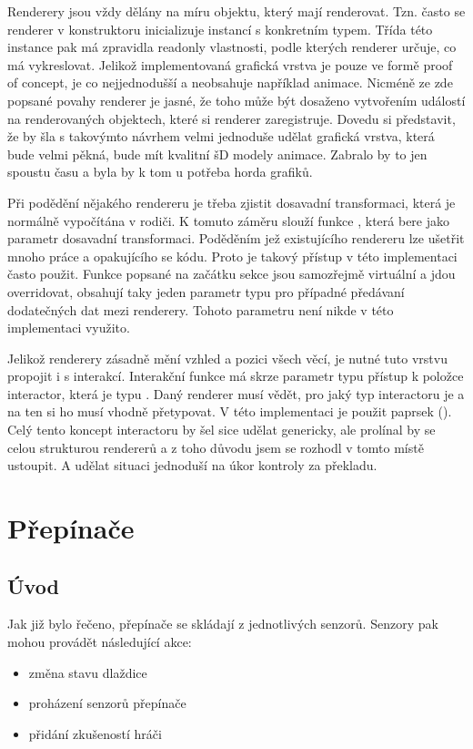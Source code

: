 Renderery jsou vždy dělány na míru objektu, který mají renderovat. Tzn. často se renderer v konstruktoru 
inicializuje instancí s konkretním typem. Třída této instance pak má zpravidla readonly vlastnosti,
podle kterých renderer určuje, co má vykreslovat. Jelikož implementovaná grafická vrstva je pouze ve formě proof of concept,
je co nejjednodušší a neobsahuje například animace. Nicméně ze zde popsané povahy renderer je jasné, že 
toho může být dosaženo vytvořením událostí na renderovaných objektech, které si renderer zaregistruje.
Dovedu si představit, že by šla s takovýmto návrhem velmi jednoduše udělat grafická vrstva, která bude
velmi pěkná, bude mít kvalitní šD modely animace. Zabralo by to jen spoustu času a byla by k tom u potřeba horda grafiků.

Při podědění nějakého rendereru je třeba zjistit dosavadní transformaci, která je normálně vypočítána v rodiči.
K tomuto záměru slouží funkce , která bere jako parametr dosavadní transformaci.
Poděděním jež existujícího rendereru lze ušetřit mnoho práce a opakujícího se kódu. Proto je takový přístup v této implementaci často použit.
Funkce popsané na začátku sekce jsou samozřejmě virtuální a jdou overridovat,
obsahují taky jeden parametr typu  pro případné předávaní dodatečných dat mezi renderery. Tohoto parametru není nikde v této implementaci využito.

Jelikož renderery zásadně mění vzhled a pozici všech věcí, je nutné tuto vrstvu propojit i s interakcí.
Interakční funkce má skrze parametr typu   přístup k položce interactor, která je typu .
Daný renderer musí vědět, pro jaký typ interactoru je a na ten si ho musí vhodně přetypovat. V této implementaci je použit paprsek (). 
Celý tento koncept interactoru by šel sice udělat genericky, ale prolínal by se celou strukturou rendererů a z toho
důvodu jsem se rozhodl v tomto místě ustoupit. A udělat situaci jednoduší na úkor kontroly za překladu.


\section{Přepínače}
\subsection{Úvod}
Jak již bylo řečeno, přepínače se skládají z jednotlivých senzorů. Senzory pak mohou provádět následující akce:

\begin{itemize}
\item změna stavu  dlaždice
\item proházení senzorů přepínače
\item přidání zkušeností hráči
\end{itemize}

